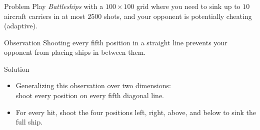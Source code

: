 \begin{frame}
    \frametitle{\problemtitle}
    \begin{block}{Problem}
        Play \emph{Battleships} with a $100 \times 100$ grid
        where you need to sink up to $10$ aircraft carriers
        in at most $2500$ shots,
        and your opponent is potentially cheating (adaptive).
    \end{block}
    \pause
    \begin{block}{Observation}
        Shooting every fifth position in a straight line
        prevents your opponent from placing ships in between them.
    \end{block}
    \pause
    \begin{block}{Solution}
        \begin{itemize}
            \item Generalizing this observation over two dimensions: \\
                shoot every position on every fifth diagonal line.
            \item For every hit, shoot the four positions left, right, above, and below
                to sink the full ship.
        \end{itemize}
    \end{block}
    \pause
    \solvestats
\end{frame}
